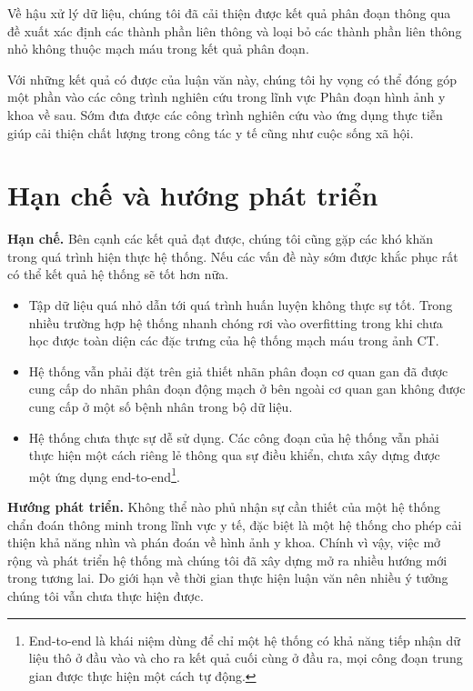 	 Về hậu xử lý dữ liệu, chúng tôi đã cải thiện được kết quả phân đoạn thông qua đề xuất xác định các thành phần liên thông và loại bỏ các thành phần liên thông nhỏ không thuộc mạch máu trong kết quả phân đoạn.
	 
	 Với những kết quả có được của luận văn này, chúng tôi hy vọng có thể đóng góp một phần vào các công trình nghiên cứu trong lĩnh vực Phân đoạn hình ảnh y khoa về sau. Sớm đưa được các công trình nghiên cứu vào ứng dụng thực tiễn giúp cải thiện chất lượng trong công tác y tế cũng như cuộc sống xã hội.

\newpage
\section{Hạn chế và hướng phát triển}
\label{sec:han_che_va_huong_phat_trien}
	\textbf{Hạn chế.\hspace{5mm}} Bên cạnh các kết quả đạt được, chúng tôi cũng gặp các khó khăn trong quá trình hiện thực hệ thống. Nếu các vấn đề này sớm được khắc phục rất có thể kết quả hệ thống sẽ tốt hơn nữa.
	\begin{itemize}
		\item Tập dữ liệu quá nhỏ dẫn tới quá trình huấn luyện không thực sự tốt. Trong nhiều trường hợp hệ thống nhanh chóng rơi vào overfitting trong khi chưa học được toàn diện các đặc trưng của hệ thống mạch máu trong ảnh CT.
		\item Hệ thống vẫn phải đặt trên giả thiết nhãn phân đoạn cơ quan gan đã được cung cấp do nhãn phân đoạn động mạch ở bên ngoài cơ quan gan không được cung cấp ở một số bệnh nhân trong bộ dữ liệu.
		\item Hệ thống chưa thực sự dễ sử dụng. Các công đoạn của hệ thống vẫn phải thực hiện một cách riêng lẻ thông qua sự điều khiển, chưa xây dựng được một ứng dụng end-to-end\footnote{End-to-end là khái niệm dùng để chỉ một hệ thống có khả năng tiếp nhận dữ liệu thô ở đầu vào và cho ra kết quả cuối cùng ở đầu ra, mọi công đoạn trung gian được thực hiện một cách tự động.}.
	\end{itemize}

	\textbf{Hướng phát triển.\hspace{5mm}} Không thể nào phủ nhận sự cần thiết của một hệ thống chẩn đoán thông minh trong lĩnh vực y tế, đặc biệt là một hệ thống cho phép cải thiện khả năng nhìn và phán đoán về hình ảnh y khoa. Chính vì vậy, việc mở rộng và phát triển hệ thống mà chúng tôi đã xây dựng mở ra nhiều hướng mới trong tương lai. Do giới hạn về thời gian thực hiện luận văn nên nhiều ý tưởng chúng tôi vẫn chưa thực hiện được.
	
